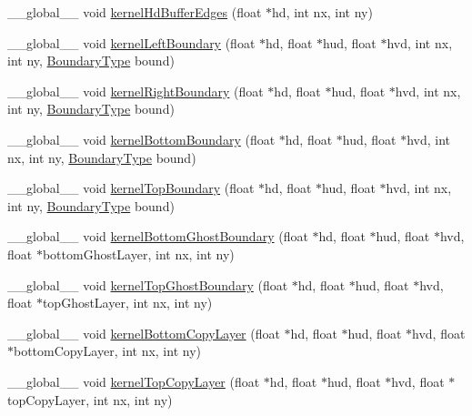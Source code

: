 \begin{DoxyCompactItemize}
\item 
\-\_\-\-\_\-global\-\_\-\-\_\- void \hyperlink{SWE__BlockCUDA__kernels_8cu_ad34d42b9197cf6063931cb1bf7c03bd4}{kernel\-Hd\-Buffer\-Edges} (float $\ast$hd, int nx, int ny)
\item 
\-\_\-\-\_\-global\-\_\-\-\_\- void \hyperlink{SWE__BlockCUDA__kernels_8cu_a70e795bea06be7152de387957e090eb3}{kernel\-Left\-Boundary} (float $\ast$hd, float $\ast$hud, float $\ast$hvd, int nx, int ny, \hyperlink{SWE__Scenario_8hh_af75d5dd7322fa39ed0af4e7839e600f8}{Boundary\-Type} bound)
\item 
\-\_\-\-\_\-global\-\_\-\-\_\- void \hyperlink{SWE__BlockCUDA__kernels_8cu_a5b25e2843f0f18a4a5843165ce46054f}{kernel\-Right\-Boundary} (float $\ast$hd, float $\ast$hud, float $\ast$hvd, int nx, int ny, \hyperlink{SWE__Scenario_8hh_af75d5dd7322fa39ed0af4e7839e600f8}{Boundary\-Type} bound)
\item 
\-\_\-\-\_\-global\-\_\-\-\_\- void \hyperlink{SWE__BlockCUDA__kernels_8cu_a776336452fee130d27d02b109a7ab89d}{kernel\-Bottom\-Boundary} (float $\ast$hd, float $\ast$hud, float $\ast$hvd, int nx, int ny, \hyperlink{SWE__Scenario_8hh_af75d5dd7322fa39ed0af4e7839e600f8}{Boundary\-Type} bound)
\item 
\-\_\-\-\_\-global\-\_\-\-\_\- void \hyperlink{SWE__BlockCUDA__kernels_8cu_a655f11967ba2a7ed124b92a9f1400788}{kernel\-Top\-Boundary} (float $\ast$hd, float $\ast$hud, float $\ast$hvd, int nx, int ny, \hyperlink{SWE__Scenario_8hh_af75d5dd7322fa39ed0af4e7839e600f8}{Boundary\-Type} bound)
\item 
\-\_\-\-\_\-global\-\_\-\-\_\- void \hyperlink{SWE__BlockCUDA__kernels_8cu_a899b7431f0cec06555bf3b0d8e848782}{kernel\-Bottom\-Ghost\-Boundary} (float $\ast$hd, float $\ast$hud, float $\ast$hvd, float $\ast$bottom\-Ghost\-Layer, int nx, int ny)
\item 
\-\_\-\-\_\-global\-\_\-\-\_\- void \hyperlink{SWE__BlockCUDA__kernels_8cu_a7cf7164d51b1b16664556c25dd675a46}{kernel\-Top\-Ghost\-Boundary} (float $\ast$hd, float $\ast$hud, float $\ast$hvd, float $\ast$top\-Ghost\-Layer, int nx, int ny)
\item 
\-\_\-\-\_\-global\-\_\-\-\_\- void \hyperlink{SWE__BlockCUDA__kernels_8cu_af1a79800b1a5fca1daaeded30541769b}{kernel\-Bottom\-Copy\-Layer} (float $\ast$hd, float $\ast$hud, float $\ast$hvd, float $\ast$bottom\-Copy\-Layer, int nx, int ny)
\item 
\-\_\-\-\_\-global\-\_\-\-\_\- void \hyperlink{SWE__BlockCUDA__kernels_8cu_a48b8d7d4d3bf3c69a289df057f4b6f3e}{kernel\-Top\-Copy\-Layer} (float $\ast$hd, float $\ast$hud, float $\ast$hvd, float $\ast$top\-Copy\-Layer, int nx, int ny)
\end{DoxyCompactItemize}


